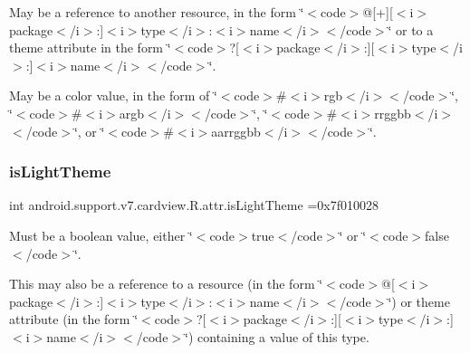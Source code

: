 May be a reference to another resource, in the form \char`\"{}$<$code$>$@\mbox{[}+\mbox{]}\mbox{[}$<$i$>$package$<$/i$>$\+:\mbox{]}$<$i$>$type$<$/i$>$\+:$<$i$>$name$<$/i$>$$<$/code$>$\char`\"{} or to a theme attribute in the form \char`\"{}$<$code$>$?\mbox{[}$<$i$>$package$<$/i$>$\+:\mbox{]}\mbox{[}$<$i$>$type$<$/i$>$\+:\mbox{]}$<$i$>$name$<$/i$>$$<$/code$>$\char`\"{}. 

May be a color value, in the form of \char`\"{}$<$code$>$\#$<$i$>$rgb$<$/i$>$$<$/code$>$\char`\"{}, \char`\"{}$<$code$>$\#$<$i$>$argb$<$/i$>$$<$/code$>$\char`\"{}, \char`\"{}$<$code$>$\#$<$i$>$rrggbb$<$/i$>$$<$/code$>$\char`\"{}, or \char`\"{}$<$code$>$\#$<$i$>$aarrggbb$<$/i$>$$<$/code$>$\char`\"{}. \mbox{\label{classandroid_1_1support_1_1v7_1_1cardview_1_1R_1_1attr_a07f175e99544ab14cf32d417a53d9957}} 
\subsubsection{\texorpdfstring{is\+Light\+Theme}{isLightTheme}}
{\footnotesize\ttfamily int android.\+support.\+v7.\+cardview.\+R.\+attr.\+is\+Light\+Theme =0x7f010028\hspace{0.3cm}{\ttfamily [static]}}

Must be a boolean value, either \char`\"{}$<$code$>$true$<$/code$>$\char`\"{} or \char`\"{}$<$code$>$false$<$/code$>$\char`\"{}. 

This may also be a reference to a resource (in the form \char`\"{}$<$code$>$@\mbox{[}$<$i$>$package$<$/i$>$\+:\mbox{]}$<$i$>$type$<$/i$>$\+:$<$i$>$name$<$/i$>$$<$/code$>$\char`\"{}) or theme attribute (in the form \char`\"{}$<$code$>$?\mbox{[}$<$i$>$package$<$/i$>$\+:\mbox{]}\mbox{[}$<$i$>$type$<$/i$>$\+:\mbox{]}$<$i$>$name$<$/i$>$$<$/code$>$\char`\"{}) containing a value of this type. \mbox{\label{classandroid_1_1support_1_1v7_1_1cardview_1_1R_1_1attr_ad7f63c9a2a7d13b6e12c2e94acd31e05}} 
